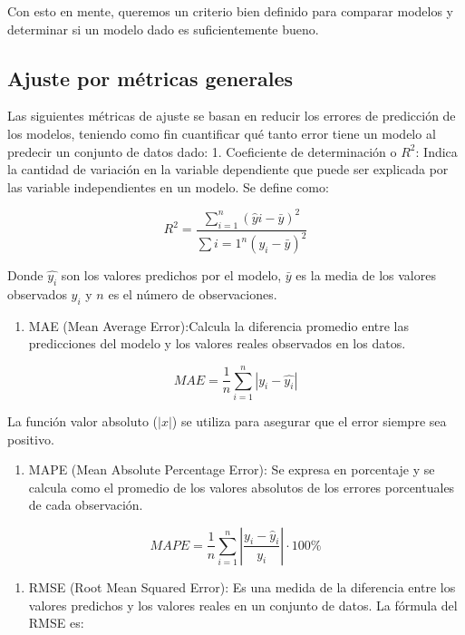 \documentclass[
]{book}
\providecommand{\tightlist}{%
  \setlength{\itemsep}{0pt}\setlength{\parskip}{0pt}}
\begin{document}
Con esto en mente, queremos un criterio bien definido para comparar
modelos y determinar si un modelo dado es suficientemente bueno.

\hypertarget{ajuste-por-muxe9tricas-generales-1}{%
\subsection{Ajuste por métricas generales}\label{ajuste-por-muxe9tricas-generales-1}}

Las siguientes métricas de ajuste se basan en reducir los errores de
predicción de los modelos, teniendo como fin cuantificar qué tanto error
tiene un modelo al predecir un conjunto de datos dado: 1. Coeficiente de
determinación o \(R^2\): Indica la cantidad de variación en la variable
dependiente que puede ser explicada por las variable independientes en
un modelo. Se define como:

\[ R^2 = \frac{\sum_{i=1}^n (\hat{y}i - \bar{y})^2}{\sum{i=1}^n (y_i - \bar{y})^2} \]

Donde \(\hat{y_i}\) son los valores predichos por el modelo, \(\bar{y}\) es
la media de los valores observados \(y_i\) y \(n\) es el número de
observaciones.

\begin{enumerate}
\def\labelenumi{\arabic{enumi}.}
\setcounter{enumi}{1}
\tightlist
\item
  MAE (Mean Average Error):Calcula la diferencia promedio entre las
  predicciones del modelo y los valores reales observados en los
  datos.
\end{enumerate}

\[MAE = \frac{1}{n}\sum_{i=1}^{n}|y_i - \hat{y_i}|\]

La función valor absoluto (\(|x|\)) se utiliza para asegurar que el error
siempre sea positivo.

\begin{enumerate}
\def\labelenumi{\arabic{enumi}.}
\setcounter{enumi}{2}
\tightlist
\item
  MAPE (Mean Absolute Percentage Error): Se expresa en porcentaje y se
  calcula como el promedio de los valores absolutos de los errores
  porcentuales de cada observación.
\end{enumerate}

\[MAPE = \frac{1}{n} \sum_{i=1}^{n} \left|\frac{y_i - \hat{y}_i}{y_i}\right|\cdot 100\%\]

\begin{enumerate}
\def\labelenumi{\arabic{enumi}.}
\setcounter{enumi}{3}
\tightlist
\item
  RMSE (Root Mean Squared Error): Es una medida de la diferencia entre
  los valores predichos y los valores reales en un conjunto de datos.
  La fórmula del RMSE es:
\end{enumerate}
\end{document}
